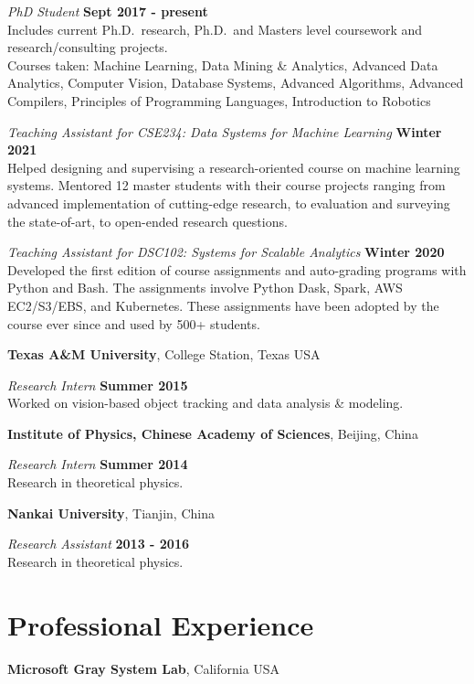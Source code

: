\documentclass[margin,line]{res}
\begin{document}
\begin{resume}
\vspace{-.3cm}
{\em PhD Student} \hfill {\bf Sept 2017 - present}\\
Includes current Ph.D.~research, Ph.D.~and Masters level coursework and
research/consulting projects.\\
Courses taken: Machine Learning, Data Mining \& Analytics, Advanced Data Analytics, Computer Vision, Database Systems, Advanced Algorithms, Advanced Compilers, Principles of Programming Languages, Introduction to Robotics

{\em Teaching Assistant for CSE234: Data Systems for Machine Learning} \hfill {\bf Winter 2021}\\
Helped designing and supervising a research-oriented course on machine learning systems. Mentored 12 master students with their course projects ranging from advanced implementation of cutting-edge research, to evaluation and surveying the state-of-art, to open-ended research questions. 

{\em Teaching Assistant for DSC102: Systems for Scalable Analytics} \hfill {\bf Winter 2020}\\
Developed the first edition of course assignments and auto-grading programs with Python and Bash. The assignments involve Python Dask, Spark, AWS EC2/S3/EBS, and Kubernetes. These assignments have been adopted by the course ever since and used by 500+ students.



{\bf Texas A\&M University}, College Station, Texas USA

\vspace{-.3cm}
{\em Research Intern} \hfill {\bf Summer 2015}\\
Worked on vision-based object tracking and data analysis \& modeling.

{\bf Institute of Physics, Chinese Academy of Sciences}, Beijing, China

\vspace{-.3cm}
{\em Research Intern} \hfill {\bf Summer 2014}\\
Research in theoretical physics.

{\bf Nankai University}, Tianjin, China

\vspace{-.3cm}
{\em Research Assistant} \hfill {\bf 2013 - 2016}\\
Research in theoretical physics.

\section{\sc Professional Experience}
{\bf Microsoft Gray System Lab}, California USA


\end{resume}
\end{document}
